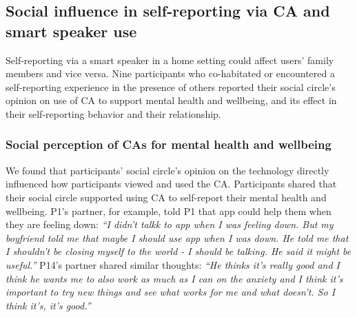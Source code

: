     
            
            
\subsection{Social influence in self-reporting via \ac{CA} and smart speaker use}
    Self-reporting via a smart speaker in a home setting could affect users' family members and vice versa. 
    Nine participants who co-habitated or encountered a self-reporting experience in the presence of others reported their
        social circle's opinion on use of \ac{CA} to support mental health and wellbeing, and 
        its effect in their self-reporting behavior and their relationship.


        \subsubsection{Social perception of \acp{CA} for mental health and wellbeing}
            We found that participants' social circle's opinion on the technology directly influenced how participants viewed and used the \ac{CA}.
            Participants shared that their social circle supported using \acl{CA} to self-report their mental health and wellbeing. P1's partner, for example, told P1 that \acl{app} could help them when they are feeling down:
                \textit{``I didn’t talkk to \acl{app} when I was feeling down. But my boyfriend told me that maybe I should use \acl{app} when I was down. 
                He told me that I shouldn’t be closing myself to the world - I should be talking. He said it might be useful.''
                }
            P14's partner shared similar thoughts:
                \textit{``He thinks it's really good and I think he wants me to also work as much as I can on the anxiety and I think it's important to try new things and see what works for me and what doesn't. So I think it's, it's good.''
                }
